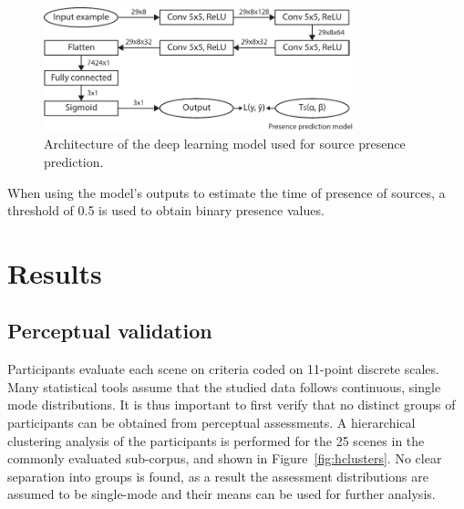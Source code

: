 \documentclass[11pt,a4paper]{article}
\begin{document}
\begin{figure}[!h]
    \centering
    \includegraphics[width=0.8\textwidth]{figures/deep_arch.pdf}
    \caption{Architecture of the deep learning model used for source presence prediction.}\label{fig:deep_arch}
\end{figure}

When using the model's outputs to estimate the time of presence of sources, a threshold of 0.5 is used to obtain binary presence values.



\section{Results}
\label{sec:results}


\subsection{Perceptual validation}
\label{sec:perc}

Participants evaluate each scene on criteria coded on 11-point discrete scales. Many statistical tools assume that the studied data follows continuous, single mode distributions. It is thus important to first verify that no distinct groups of participants can be obtained from perceptual assessments. A hierarchical clustering analysis of the participants is performed for the 25 scenes in the commonly evaluated sub-corpus, and shown in Figure~\ref{fig:hclusters}. No clear separation into groups is found, as a result the assessment distributions are assumed to be single-mode and their means can be used for further analysis.\\
\end{document}
